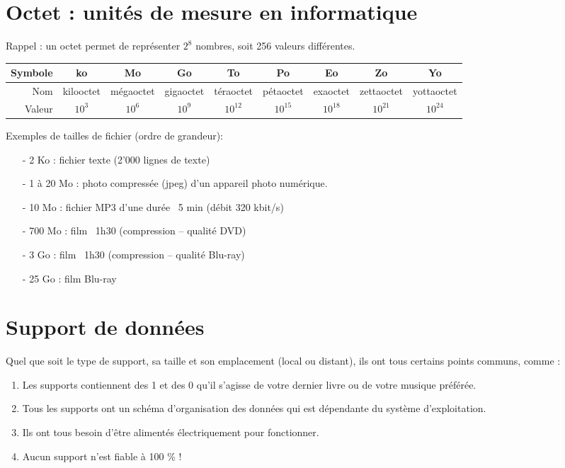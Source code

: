 \documentclass[11pt, a4paper]{book}
\begin{document}
\section{Octet : unités de mesure en informatique}
Rappel : un octet permet de représenter $2^8$ nombres, soit 256 valeurs différentes.
\begin{center}
   \begin{tabular}{| r || c |  c | c | c | c | c | c |  c |}
     \hline
     Symbole & ko & Mo & Go & To & Po & Eo & Zo & Yo \\ \hline
     Nom & kilooctet & mégaoctet & gigaoctet & téraoctet & pétaoctet & exaoctet & zettaoctet & yottaoctet   \\ \hline
     Valeur & $10^{3}$ & $10^{6}$ & $10^{9}$ & $10^{12}$ & $10^{15}$ & $10^{18}$ & $10^{21}$ & $10^{24}$  \\ \hline
   \end{tabular}
\end{center}

Exemples de tailles de fichier (ordre de grandeur):
\begin{enumerate}
    \item[-] 2 Ko :        fichier texte (2’000 lignes de texte)
    \item[-] 1 à 20 Mo :    photo compressée (jpeg) d’un appareil photo numérique.
    \item[-] 10 Mo :     fichier MP3 d’une durée ~5 min (débit 320 kbit/s)
    \item[-] 700 Mo :     film ~1h30 (compression – qualité DVD)
    \item[-] 3 Go :         film ~1h30 (compression – qualité Blu-ray)
    \item[-] 25 Go :     film Blu-ray
\end{enumerate}

\section{Support de données}

Quel que soit le type de support, sa taille et son emplacement (local ou distant), ils ont tous certains points communs, comme :
\begin{enumerate}
\item Les supports contiennent des 1 et des 0 qu’il s’agisse de votre dernier livre ou de votre musique préférée.
\item Tous les supports ont un schéma d’organisation des données qui est dépendante du système d’exploitation.
\item Ils ont tous besoin d’être alimentés électriquement pour fonctionner.
\item Aucun support n’est fiable à 100 \% !
\end{enumerate}
\end{document}

